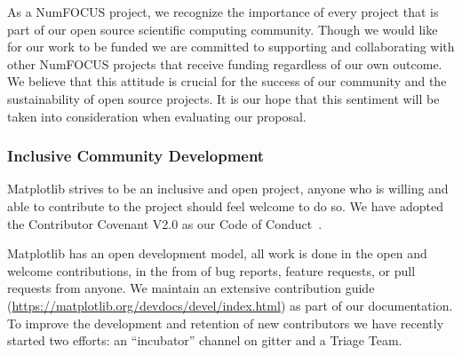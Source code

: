 \documentclass[12pt]{article}
\numberwithin{page}{section}
\begin{document}
As a NumFOCUS project, we recognize the importance of every project
that is part of our open source scientific computing community. Though
we would like for our work to be funded we are committed to supporting
and collaborating with other NumFOCUS projects that receive funding
regardless of our own outcome. We believe that this attitude is
crucial for the success of our community and the sustainability of
open source projects. It is our hope that this sentiment will be taken
into consideration when evaluating our proposal.


\subsubsection{Inclusive Community Development}


Matplotlib strives to be an inclusive and open project, anyone who is
willing and able to contribute to the project should feel welcome to
do so.  We have adopted the Contributor Covenant V2.0 as
our Code of Conduct~\cite{CoC}.

Matplotlib has an open development model, all work is done in the open
and welcome contributions, in the from of bug reports, feature
requests, or pull requests from anyone.  We maintain an extensive
contribution guide
(\url{https://matplotlib.org/devdocs/devel/index.html}) as part of our
documentation.  To improve the development and retention of new
contributors we have recently started two efforts: an ``incubator''
channel on gitter and a Triage Team.

%
\end{document}
